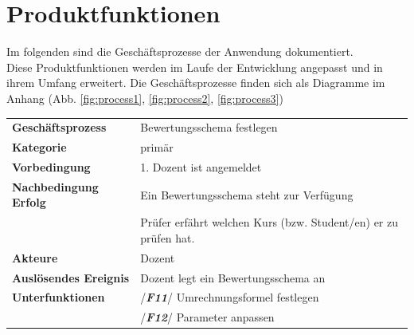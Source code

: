 	\section{Produktfunktionen\label{chap:Prfunk}}
	Im folgenden sind die Geschäftsprozesse der Anwendung dokumentiert.\\
	Diese Produktfunktionen werden im Laufe der Entwicklung angepasst und in ihrem Umfang erweitert.
	Die Geschäftsprozesse finden sich als Diagramme im Anhang (Abb. \ref{fig:process1}, \ref{fig:process2}, \ref{fig:process3})
	
		\begin{table}[H]
			\begin{tabular}{|ll}
				\rowcolor{hellgrau}\multicolumn{2}{l}{/\textbf{\textit{F10}}/}\\\hline
				 \textbf{Geschäftsprozess} & Bewertungsschema festlegen \\ 
				 \textbf{Kategorie} & primär \\ 
				 \textbf{Vorbedingung} & 1. Dozent ist angemeldet  \\ 
				 \textbf{Nachbedingung Erfolg\phantom{xxxx}} & Ein Bewertungsschema steht zur Verfügung\\ 
				 & Prüfer erfährt welchen Kurs (bzw.  Student/en) er zu prüfen hat.\\
				 \textbf{Akteure} & Dozent \\ 
				 \textbf{Auslösendes Ereignis} & Dozent legt ein Bewertungsschema an  \\ 
				 \textbf{Unterfunktionen} & /\textbf{\textit{F11}}/ Umrechnungsformel festlegen\\
				 & /\textbf{\textit{F12}}/ Parameter anpassen
				 \end{tabular} 
			\label{tab:F10}
			\end{table}
	
